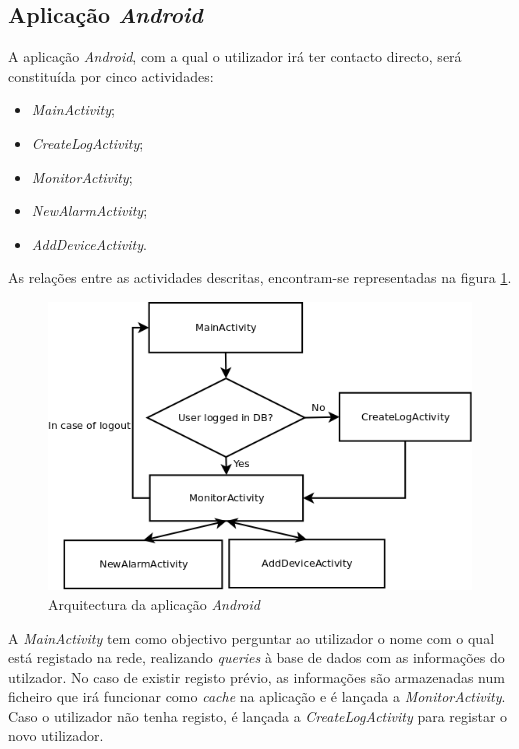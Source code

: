 \documentclass[a4paper]{article}
\begin{document}
\subsection{Aplicação \textit{Android}}

A aplicação \textit{Android}, com a qual o utilizador irá ter contacto directo, será constituída por cinco actividades:

\begin{itemize}
\item \textit{MainActivity};
\item \textit{CreateLogActivity};
\item \textit{MonitorActivity};
\item \textit{NewAlarmActivity};
\item \textit{AddDeviceActivity}.
\end{itemize}

As relações entre as actividades descritas, encontram-se representadas na figura \ref{fig:app_android_geral}.

\vspace{5mm}

\begin{figure}[hb]
  \centering
  \includegraphics[scale=0.40]{App_geral.png}
  \caption{Arquitectura da aplicação \textit{Android}}
  \label{fig:app_android_geral}
\end{figure}

A \textit{MainActivity} tem como objectivo perguntar ao utilizador o nome com o qual está registado na rede, realizando \textit{queries} à base de dados com as informações do utilzador. No caso de existir registo prévio, as informações são armazenadas num ficheiro que irá funcionar como \textit{cache} na aplicação e é lançada a \textit{MonitorActivity}. Caso o utilizador não tenha registo, é lançada a \textit{CreateLogActivity} para registar o novo utilizador. 
\end{document}

